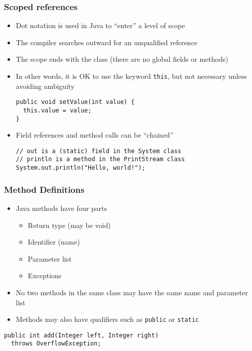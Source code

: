 \documentclass{beamer}
\begin{document}
\begin{frame}[fragile]
\frametitle{Scoped references}
\begin{itemize}
\item Dot notation is used in Java to ``enter'' a level of scope
\item The compiler searches outward for an unqualified reference
\item The scope ends with the class (there are no global fields or methods)
\item In other words, it is OK to use the keyword \texttt{this}, but not necessary unless avoiding ambiguity
\lstset{language=Java}
\begin{lstlisting}
public void setValue(int value) {
  this.value = value;
}
\end{lstlisting}
\item Field references and method calls can be ``chained''
\lstset{language=Java}
\begin{lstlisting}
// out is a (static) field in the System class
// println is a method in the PrintStream class
System.out.println("Hello, world!");
\end{lstlisting}
\end{itemize}
\end{frame}

\begin{frame}[fragile]
\frametitle{Method Definitions}
\begin{itemize}
\item Java methods have four parts
\begin{itemize}
\item Return type (may be void)
\item Identifier (name)
\item Parameter list
\item Exceptions
\end{itemize}
\item No two methods in the same class may have the same name and parameter list
\item Methods may also have qualifiers such as \texttt{public} or \texttt{static}
\end{itemize}
\lstset{language=Java}
\begin{lstlisting}
public int add(Integer left, Integer right) 
  throws OverflowException;
\end{lstlisting}
\end{frame}
\end{document}
